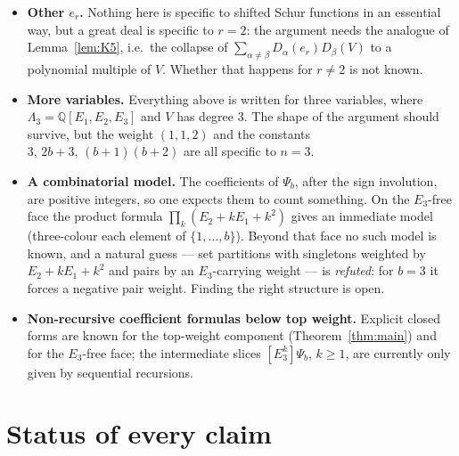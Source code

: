 \documentclass[10pt]{article}
\theoremstyle{plain}
\theoremstyle{definition}
\newcommand{\bbQ}{\mathbb{Q}}
\newcommand{\Lam}{\Lambda_3}
\begin{document}
\begin{itemize}
\item \textbf{Other $e_r$.} Nothing here is specific to shifted Schur functions in an
essential way, but a great deal is specific to $r=2$: the argument needs the analogue of
Lemma~\ref{lem:K5}, i.e.\ the collapse of $\sum_{\alpha\ne\beta}D_\alpha(e_r)D_\beta(V)$ to
a polynomial multiple of $V$. Whether that happens for $r\ne2$ is not known.
\item \textbf{More variables.} Everything above is written for three variables, where
$\Lam=\bbQ[E_1,E_2,E_3]$ and $V$ has degree $3$. The shape of the argument should survive,
but the weight $(1,1,2)$ and the constants $3,\,2b+3,\,(b+1)(b+2)$ are all specific to
$n=3$.
\item \textbf{A combinatorial model.} The coefficients of $\Psi_b$, after the sign
involution, are positive integers, so one expects them to count something. On the $E_3$-free
face the product formula $\prod_k(E_2+kE_1+k^2)$ gives an immediate model (three-colour each
element of $\{1,\dots,b\}$). Beyond that face no such model is known, and a natural guess
--- set partitions with singletons weighted by $E_2+kE_1+k^2$ and pairs by an $E_3$-carrying
weight --- is \emph{refuted}: for $b=3$ it forces a negative pair weight. Finding the right
structure is open.
\item \textbf{Non-recursive coefficient formulas below top weight.} Explicit closed forms
are known for the top-weight component (Theorem~\ref{thm:main}) and for the $E_3$-free face;
the intermediate slices $[E_3^k]\Psi_b$, $k\ge1$, are currently only given by sequential
recursions.
\end{itemize}

\section{Status of every claim}\label{sec:status}
\end{document}
